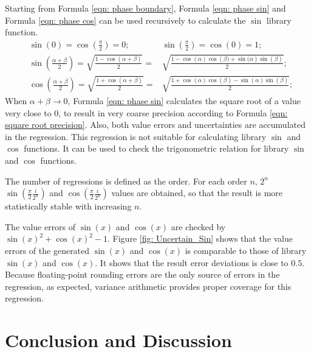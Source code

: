 \documentclass[twoside]{article}
\numberwithin{equation}{section}
\begin{document}
Starting from Formula \eqref{eqn: phase boundary}, Formula \eqref{eqn: phase sin} and Formula \eqref{eqn: phase cos} can be used recursively to calculate the $\sin$ library function.  
\begin{align}
\label{eqn: phase boundary}
& \sin(0) = \cos(\frac{\pi}{2}) = 0; & \sin(\frac{\pi}{2}) = \cos(0) = 1; \\
\label{eqn: phase sin}
& \sin \left(\frac{\alpha + \beta}{2} \right) = \sqrt{\frac{1 - \cos \left(\alpha + \beta \right)}{2}} = & \sqrt{\frac{1 - \cos(\alpha) \cos \left(\beta) + \sin(\alpha \right) \sin(\beta)}{2}}; \\
\label{eqn: phase cos}
& \cos \left(\frac{\alpha + \beta}{2} \right) = \sqrt{\frac{1 + \cos \left(\alpha + \beta \right)}{2}} = & \sqrt{\frac{1 + \cos(\alpha) \cos(\beta) - \sin(\alpha) \sin(\beta)}{2}};
\end{align}
When $\alpha + \beta \rightarrow 0$, Formula \eqref{eqn: phase sin} calculates the square root of a value very close to 0, to result in very coarse precision according to Formula \eqref{eqn: square root precision}.
Also, both value errors and uncertainties are accumulated in the regression.
This regression is not suitable for calculating library $\sin$ and $\cos$ functions.
It can be used to check the trigonometric relation for library $\sin$ and $\cos$ functions.

The number of regressions is defined as the order.
For each order $n$, $2^n$ $\sin(\frac{\pi}{2} \frac{i}{2^n})$ and $\cos(\frac{\pi}{2} \frac{i}{2^n})$ values are obtained, so that the result is more statistically stable with increasing $n$.

The value errors of $\sin(x)$ and $\cos(x)$ are checked by $\sin(x)^2 + \cos(x)^2 - 1$.
Figure \ref{fig: Uncertain_Sin} shows that the value errors of the generated $\sin(x)$ and $\cos(x)$ is comparable to those of library $\sin(x)$ and $\cos(x)$.
It shows that the result error deviations is close to $0.5$.
Because floating-point rounding errors are the only source of errors in the regression, as expected, variance arithmetic provides proper coverage for this regression.








\clearpage
\section{Conclusion and Discussion}
\label{sec: conclusion and discussion}
\end{document}
